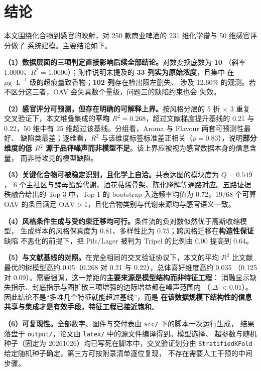
\section{结论}

本文围绕化合物到感官的映射，对 250 款商业啤酒的 231 维化学谱与 50 维感官评分做了
系统建模。主要结论如下。

\textbf{（1）数据层面的三项判定直接影响后续全部结论。}对数变换底数为 \textbf{10}
（斜率 1.0000、$R^2=1.0000$）；附件说明未提及的 \textbf{33 列实为原始浓度}，且集中
在 $\mu\mathrm{g\cdot L^{-1}}$ 级的超痕量致香物；\textbf{102 列}存在检出限左删失、
涉及 12.60\% 的观测。若不区分这三者，OAV 会失真数个量级，问题三的缺陷约束也会
失效。

\textbf{（2）感官评分可预测，但存在明确的可解释上界。}按风格分层的 5 折 $\times$
3 重复交叉验证下，本文堆叠集成的\textbf{平均 $R^2=0.268$}，超过文献梯度提升基线的
0.21 与 0.22，50 维中有 25 维超过该基线。分组看，Aroma 与 Flavour 两套可预测性最好、
缺陷类最差；逐维看，$R^2$ 与该维度标签标准差正相关（$\rho=0.83$），说明\textbf{部分
维度的低 $R^2$ 源于品评噪声而非模型不足}。该上界应被视为感官数据本身的信息含量，
而非待攻克的模型缺陷。

\textbf{（3）关键化合物可被稳定识别，且化学上自洽。}共表达图的模块度为 $Q=0.549$，
6 个主社区与酵母酯醇代谢、酒花萜烯骨架、陈化降解等通路对应。五路证据秩融合给出的
Top-3 中，Top-1 的 bootstrap 入选频率均值为 0.72，19/68 个可算 OAV 的条目满足
$\mathrm{OAV}>1$，且化合物类别与代谢来源均与感官语义一致。

\textbf{（4）风格条件生成与受约束迁移均可行。}条件流的负对数似然优于高斯收缩模型，
生成样本的风格保真度为 0.81、多样性比为 0.75；跨风格迁移在\textbf{构造性保证}缺陷
不恶化的前提下，把 Pils/Lager 被判为 Tripel 的比例由 0.00 提高到 0.64。

\textbf{（5）与文献基线的对照。}在完全相同的交叉验证协议下，本文的平均 $R^2$ 比文献
最优的树模型高约 0.05（0.268 对 0.21 与 0.22），总体喜好维度高约 0.035
（0.125 对 0.09）。需要强调，这一差距的\textbf{主要来源是模型结构而非特征工程}：
消融显示缺失指示、封底指示与图扩散三项增强的边际增益都在噪声范围内
（$|\Delta|<0.01$）。因此结论不是“多堆几个特征就能超过基线”，而是
\textbf{在该数据规模下结构性的信息共享与集成才是有效手段，特征工程已接近饱和}。

\textbf{（6）可复现性。}全部数字、图件与交付表由 \texttt{src/} 下的脚本一次运行生成，
结果落盘于 \texttt{output/}，论文由 \texttt{latex/} 中的源文件编译得到。模型选择、
超参数与随机种子（固定为 20261026）均已写死在脚本中，交叉验证划分由
\texttt{StratifiedKFold} 给定随机种子确定，第三方可按附录清单逐位复现，
不存在需要人工干预的中间步骤。
